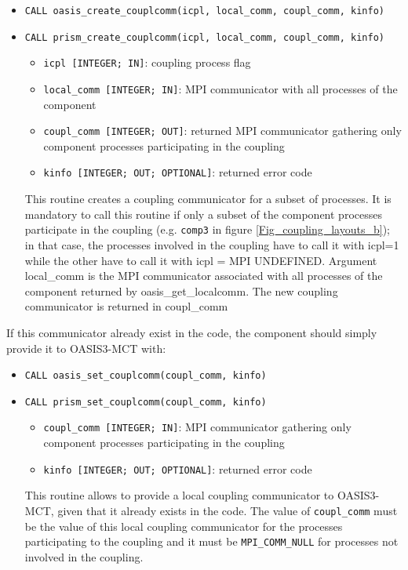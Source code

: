 \begin{itemize}
\item {\tt CALL oasis\_create\_couplcomm(icpl, local\_comm,
    coupl\_comm, kinfo)}
\item {\tt CALL prism\_create\_couplcomm(icpl, local\_comm,
    coupl\_comm, kinfo)}
  \begin{itemize}
  \item {\tt icpl [INTEGER; IN]}: coupling process flag
  \item {\tt local\_comm [INTEGER; IN]}: MPI communicator with all
    processes of the component
  \item {\tt coupl\_comm [INTEGER; OUT]}: returned MPI communicator
    gathering only component processes participating in the coupling
  \item {\tt kinfo [INTEGER; OUT; OPTIONAL]}: returned error code
  \end{itemize}

  This routine creates a coupling communicator for a subset of
  processes. It is mandatory to call this routine if only a subset of
  the component processes participate in the coupling (e.g. {\tt comp3} in figure
    \ref{Fig_coupling_layouts_b}); in that case, the processes
    involved in the coupling have to call it with icpl=1 while the
    other have to call it with icpl = MPI UNDEFINED. Argument
    local\_comm is the MPI communicator associated with all processes
    of the component returned by oasis\_get\_localcomm. The new coupling 
    communicator is returned in coupl\_comm

\end{itemize}
If this communicator already exist in the code, the component should
simply provide it to OASIS3-MCT with:

\begin{itemize}
\item {\tt CALL oasis\_set\_couplcomm(coupl\_comm, kinfo)}
\item {\tt CALL prism\_set\_couplcomm(coupl\_comm, kinfo)}
  \begin{itemize}
  \item {\tt coupl\_comm [INTEGER; IN]}: MPI communicator gathering
    only component processes participating in the coupling
  \item {\tt kinfo [INTEGER; OUT; OPTIONAL]}: returned error code
  \end{itemize}

  This routine allows to provide a local coupling communicator to
  OASIS3-MCT, given that it already exists in the code. The value of
  {\tt coupl\_comm} must be the value of this local coupling
  communicator for the processes participating to the coupling and it
  must be {\tt MPI\_COMM\_NULL} for processes not involved in the
  coupling.
\end{itemize}

